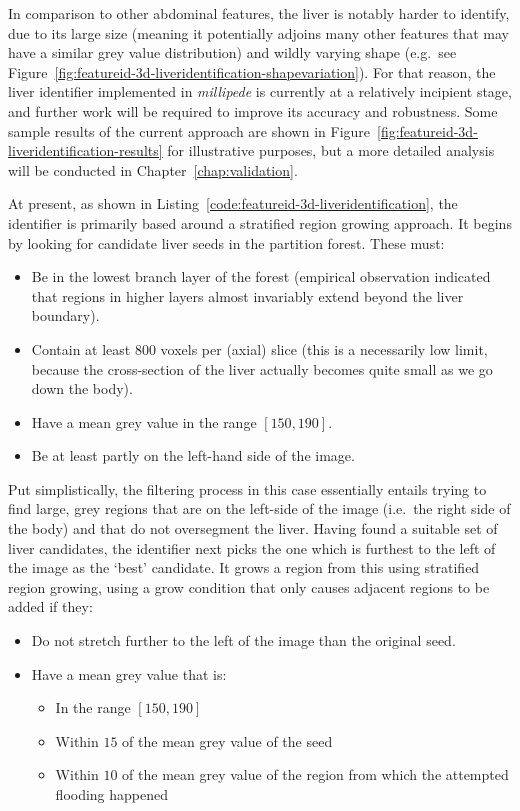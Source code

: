 \noindent In comparison to other abdominal features, the liver is notably harder to identify, due to its large size (meaning it potentially adjoins many other features that may have a similar grey value distribution) and wildly varying shape (e.g.~see Figure~\ref{fig:featureid-3d-liveridentification-shapevariation}). For that reason, the liver identifier implemented in \emph{millipede} is currently at a relatively incipient stage, and further work will be required to improve its accuracy and robustness. Some sample results of the current approach are shown in Figure~\ref{fig:featureid-3d-liveridentification-results} for illustrative purposes, but a more detailed analysis will be conducted in Chapter~\ref{chap:validation}.

At present, as shown in Listing~\ref{code:featureid-3d-liveridentification}, the identifier is primarily based around a stratified region growing approach. It begins by looking for candidate liver seeds in the partition forest. These must:
%
\begin{itemize}
\item Be in the lowest branch layer of the forest (empirical observation indicated that regions in higher layers almost invariably extend beyond the liver boundary).
\item Contain at least $800$ voxels per (axial) slice (this is a necessarily low limit, because the cross-section of the liver actually becomes quite small as we go down the body).
\item Have a mean grey value in the range $[150,190]$.
\item Be at least partly on the left-hand side of the image.
\end{itemize}
%
Put simplistically, the filtering process in this case essentially entails trying to find large, grey regions that are on the left-side of the image (i.e.~the right side of the body) and that do not oversegment the liver. Having found a suitable set of liver candidates, the identifier next picks the one which is furthest to the left of the image as the `best' candidate. It grows a region from this using stratified region growing, using a grow condition that only causes adjacent regions to be added if they:
%
\begin{itemize}
\item Do not stretch further to the left of the image than the original seed.
\item Have a mean grey value that is:

\begin{itemize}
\item In the range $[150,190]$
\item Within $15$ of the mean grey value of the seed
\item Within $10$ of the mean grey value of the region from which the attempted flooding happened
\end{itemize}

\end{itemize}
